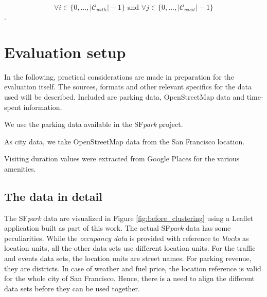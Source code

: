 \documentclass{ws-ijait}
\begin{document}
		$$\forall i \in \{0,...,|\mathcal{C}_{with}|-1\} \text{ and } \forall j \in \{0,...,|\mathcal{C}_{wout}|-1\}$$.
		
		\section{Evaluation setup}
		In the following, practical considerations are made in preparation for the evaluation itself. The sources, formats and other relevant specifics for the data used will be described. Included are parking data, OpenStreetMap data and time-spent information.
		
		We use the parking data available in the SF\textit{park} project. 
		
		As city data, we take OpenStreetMap data from the San Francisco location. 
		
		Visiting duration values were extracted from Google Places for the various amenities. 
		
		
		\subsection{The data in detail}
		The SF\textit{park} data are visualized in Figure \ref{fig:before_clustering} using a Leaflet application built as part of this work.
		The actual SF\textit{park} data has some peculiarities.
		While the \textit{occupancy data} is provided with reference to \textit{blocks} as location units, all the other data sets use different location units.
		For the traffic and events data sets, the location units are street names.
		For parking revenue, they are districts.
		In case of weather and fuel price, the location reference is valid for the whole city of San Francisco. 
		Hence, there is a need to align the different data sets before they can be used together.
		
\end{document}
